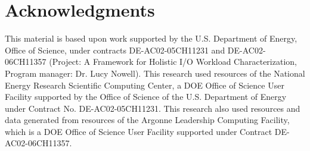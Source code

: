 \documentclass[sigconf,10pt]{acmart}
\begin{document}










\section*{Acknowledgments}
This material is based upon work supported by the U.S. Department of Energy, Office of Science, under contracts DE-AC02-05CH11231 and DE-AC02-06CH11357 (Project: A Framework for Holistic I/O Workload Characterization, Program manager: Dr. Lucy Nowell).
This research used resources of the National Energy Research Scientific Computing Center, a DOE Office of Science
User Facility supported by the Office of Science of the U.S. Department of Energy under Contract No. DE-AC02-05CH11231.
This research also used resources and data generated from resources of the Argonne Leadership Computing Facility, which is a DOE Office of Science User Facility supported under Contract DE-AC02-06CH11357.


%


% 

% 
\end{document}
